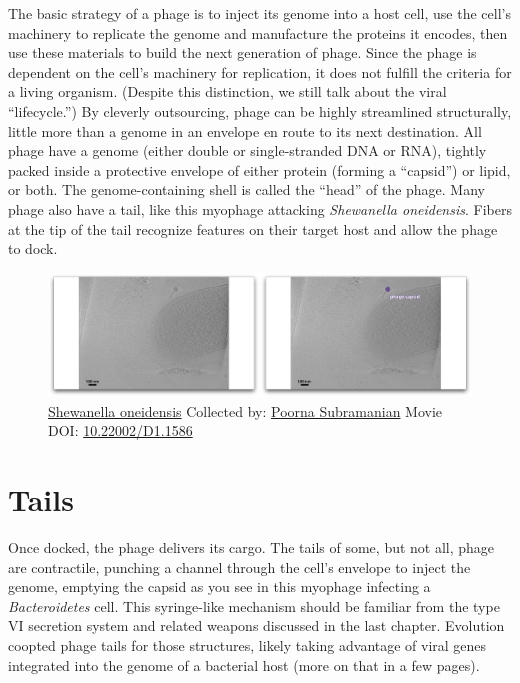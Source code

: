 \documentclass[]{tufte-book}
\begin{document}
The basic strategy of a phage is to inject its genome into a host cell,
use the cell's machinery to replicate the genome and manufacture the
proteins it encodes, then use these materials to build the next
generation of phage. Since the phage is dependent on the cell's
machinery for replication, it does not fulfill the criteria for a living
organism. (Despite this distinction, we still talk about the viral
``lifecycle.'') By cleverly outsourcing, phage can be highly streamlined
structurally, little more than a genome in an envelope en route to its
next destination. All phage have a genome (either double or
single-stranded DNA or RNA), tightly packed inside a protective envelope
of either protein (forming a ``capsid'') or lipid, or both. The
genome-containing shell is called the ``head'' of the phage. Many phage
also have a tail, like this myophage attacking \emph{Shewanella
oneidensis}. Fibers at the tip of the tail recognize features on their
target host and allow the phage to dock.





\begin{figure}
\includegraphics{movie_stills/10_1} \caption[\protect\hyperlink{tree}{Shewanella oneidensis} Collected by:
\protect\hyperlink{poorna_subramanian}{Poorna Subramanian} Movie DOI:
\href{https://doi.org/10.22002/D1.1586}{10.22002/D1.1586}]{\protect\hyperlink{tree}{Shewanella oneidensis} Collected by:
\protect\hyperlink{poorna_subramanian}{Poorna Subramanian} Movie DOI:
\href{https://doi.org/10.22002/D1.1586}{10.22002/D1.1586}}\label{fig:10-1}
\end{figure}

\section{Tails}\label{tails}

Once docked, the phage delivers its cargo. The tails of some, but not
all, phage are contractile, punching a channel through the cell's
envelope to inject the genome, emptying the capsid as you see in this
myophage infecting a \emph{Bacteroidetes} cell. This syringe-like
mechanism should be familiar from the type VI secretion system and
related weapons discussed in the last chapter. Evolution coopted phage
tails for those structures, likely taking advantage of viral genes
integrated into the genome of a bacterial host (more on that in a few
pages).
\end{document}
